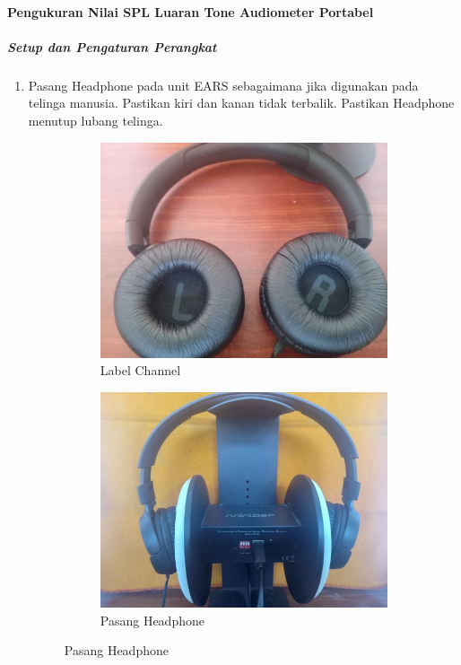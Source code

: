 \documentclass{article}
\begin{document}
	\paragraph{Pengukuran Nilai SPL Luaran Tone Audiometer Portabel}
	\subparagraph{Setup dan Pengaturan Perangkat}
		\begin{enumerate}
			\item Pasang Headphone pada unit EARS sebagaimana jika digunakan pada telinga manusia.
			Pastikan kiri dan kanan tidak terbalik.
			Pastikan Headphone menutup lubang telinga.
			
			\begin{figure}[H]
				\centering
				\begin{subfigure}[H]{0.4\textwidth}
					\includegraphics[width=\textwidth]{images/pasang/chjbl}
					\caption{Label Channel}
				\end{subfigure}
				\begin{subfigure}[H]{0.4\textwidth}
					\includegraphics[width=\textwidth]{images/pasang/pasangjbl}
					\caption{Pasang Headphone}
				\end{subfigure}
				

\end{figure}
\end{enumerate}
\end{document}
